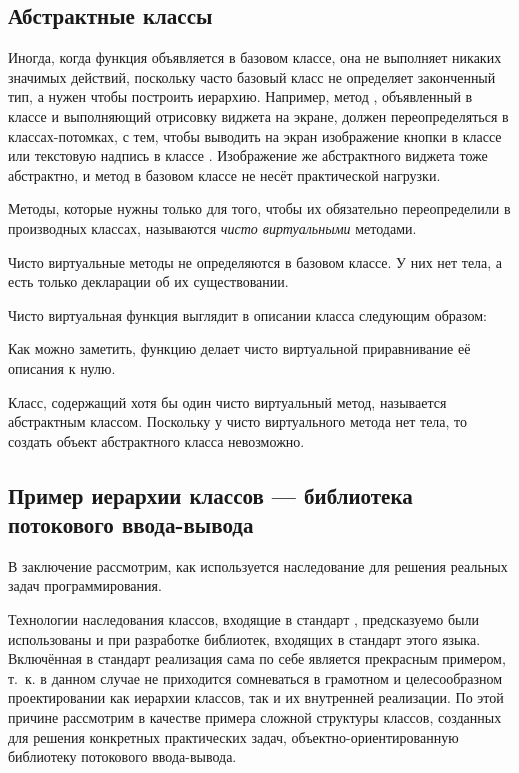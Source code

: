 \subsection[Абстрактные классы]{Абстрактные классы}
Иногда, когда функция объявляется в базовом классе, она не выполняет никаких значимых действий,
поскольку часто базовый класс не определяет законченный тип, а нужен чтобы построить иерархию. Например, метод
, объявленный в классе  и  выполняющий отрисовку виджета на
экране, должен переопределяться в классах-потомках, с тем, чтобы выводить на экран изображение кнопки в классе
 или текстовую надпись в классе . Изображение
же абстрактного виджета тоже абстрактно, и метод в базовом классе не несёт практической нагрузки.

Методы, которые нужны только для того, чтобы их обязательно переопределили в производных классах, называются
\emph{чисто виртуальными} методами.

Чисто виртуальные методы не определяются в базовом классе. У них нет тела, а есть только декларации об их существовании.

Чисто виртуальная функция выглядит в описании класса следующим образом:


Как можно заметить, функцию делает чисто виртуальной приравнивание её описания к нулю.

Класс, содержащий хотя бы один чисто виртуальный метод, называется абстрактным классом.
Поскольку у чисто виртуального метода нет тела, то создать объект абстрактного класса невозможно.

\subsection[Пример иерархии классов --- библиотека потокового ввода-вывода]{Пример иерархии классов --- библиотека
потокового ввода-вывода}\label{ch10:3.6}

В заключение рассмотрим, как используется наследование для решения реальных задач
программирования.

Технологии наследования классов, входящие в стандарт , предсказуемо были использованы и при разработке библиотек,
входящих в стандарт этого языка. Включённая в стандарт реализация сама по себе является прекрасным примером, т.~к. в
данном случае не приходится сомневаться в грамотном и целесообразном проектировании как иерархии классов, так и их
внутренней реализации. По этой причине рассмотрим в качестве примера сложной структуры классов, созданных для решения
конкретных практических задач,  объектно-ориентированную библиотеку потокового ввода-вывода. 


